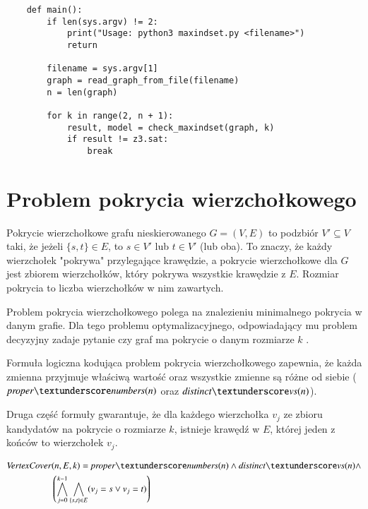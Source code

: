 \begin{lstlisting}
	def main():
		if len(sys.argv) != 2:
			print("Usage: python3 maxindset.py <filename>")
			return
		
		filename = sys.argv[1]
		graph = read_graph_from_file(filename)
		n = len(graph)
		
		for k in range(2, n + 1):
			result, model = check_maxindset(graph, k)
			if result != z3.sat:
				break
\end{lstlisting}


\section{Problem pokrycia wierzchołkowego}
Pokrycie wierzchołkowe grafu nieskierowanego $G = (V, E)$ to podzbiór $V' \subseteq V$ taki, że jeżeli $\{s, t\} \in E$, to $s \in V'$ lub $t \in V'$ (lub oba). To znaczy, że każdy wierzchołek "pokrywa" przylegające krawędzie, a pokrycie wierzchołkowe dla \(G\) jest zbiorem wierzchołków, który pokrywa wszystkie krawędzie z \(E\). Rozmiar pokrycia to liczba wierzchołków w nim zawartych.

Problem pokrycia wierzchołkowego polega na znalezieniu minimalnego pokrycia w danym grafie. Dla tego problemu optymalizacyjnego, odpowiadający mu problem decyzyjny zadaje pytanie czy graf ma pokrycie o danym rozmiarze \(k\) \cite{CormenLRS0023376}.

Formuła logiczna kodująca problem pokrycia wierzchołkowego zapewnia, że każda zmienna przyjmuje właściwą wartość oraz wszystkie zmienne są różne od siebie ($\propernumbers$ oraz $\distinctvs$).


Druga część formuły gwarantuje, że dla każdego wierzchołka \(v_j\) ze zbioru kandydatów na pokrycie o rozmiarze \(k\), istnieje krawędź w \(E\), której jeden z końców to wierzchołek \(v_j\). 




\begin{align*}
	\VertexCover&(n, E, k) = \propernumbers \land \distinctvs \land \\
	&\left( \bigwedge_{j=0}^{k-1} \bigwedge_{\{s,t\} \in E} (v_j = s \lor v_j = t) \right)	
\end{align*}


